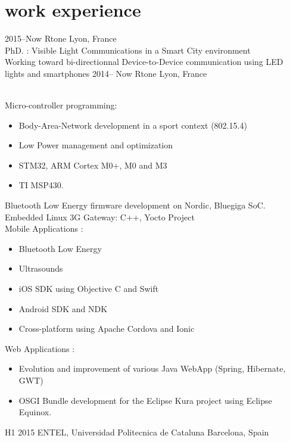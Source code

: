 \documentclass[]{cv-style}          %
\begin{document}
\section{work experience}

\begin{entrylist}
\entry
  {2015--Now}
  {Rtone}
  {Lyon, France}
  {\\
  PhD. : Visible Light Communications in a Smart City environment\\
  Working toward bi-directionnal Device-to-Device communication using LED lights and smartphones}
\entry
  {2014-- Now}
  {Rtone}
  {Lyon, France}
  {\\
  Micro-controller programming:
  \begin{itemize}
    \item Body-Area-Network development in a sport context (802.15.4)
    \item Low Power management and optimization
    \item STM32, ARM Cortex M0+, M0 and M3
    \item TI MSP430.
  \end{itemize}
  Bluetooth Low Energy firmware development on Nordic, Bluegiga SoC.\\
  Embedded Linux 3G Gateway: C++, Yocto Project\\
  Mobile Applications :
  \begin{itemize}
    \item Bluetooth Low Energy
    \item Ultrasounds
    \item iOS SDK using Objective C and Swift
    \item Android SDK and NDK
    \item Cross-platform using Apache Cordova and Ionic
  \end{itemize}
  Web Applications :
  \begin{itemize}
    \item Evolution and improvement of various Java WebApp (Spring, Hibernate, GWT)
    \item OSGI Bundle development for the Eclipse Kura project using Eclipse Equinox.
  \end{itemize}}
 \entry
  {H1 2015  }
  {ENTEL, Universidad Politecnica de Cataluna}
  {Barcelona, Spain}
  {\\
}
\end{entrylist}
\end{document}

